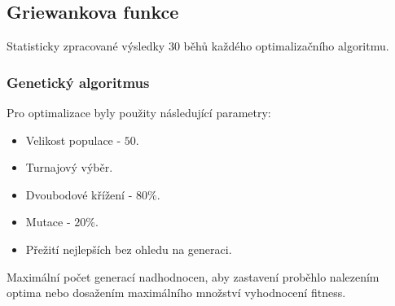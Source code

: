 





\subsection{Griewankova funkce}
\label{app:bench:griew}

Statisticky zpracované výsledky $30$ běhů každého optimalizačního algoritmu.
\subsubsection{Genetický algoritmus}
Pro optimalizace byly použity následující parametry:
\begin{itemize}
    \item Velikost populace - $50$.
    \item Turnajový výběr.
    \item Dvoubodové křížení - $80\%$.
    \item Mutace - $20\%$.
    \item Přežití nejlepších bez ohledu na generaci.
\end{itemize}
Maximální počet generací nadhodnocen, aby zastavení proběhlo nalezením optima nebo dosažením maximálního množství vyhodnocení fitness.

